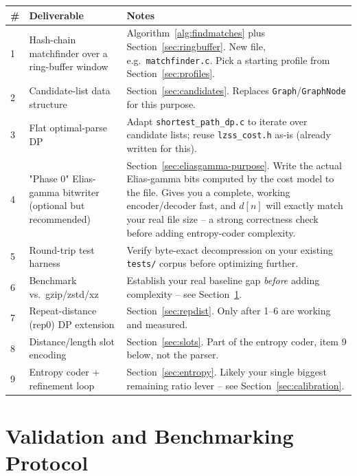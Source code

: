 \documentclass[11pt]{article}
\begin{document}
\begin{center}
\begin{tabular}{@{}p{0.5cm}p{4.3cm}p{7.5cm}@{}}
\toprule
\# & Deliverable & Notes \\
\midrule
1 & Hash-chain matchfinder over a ring-buffer window & Algorithm~\ref{alg:findmatches}
plus Section~\ref{sec:ringbuffer}. New file, e.g.\ \texttt{matchfinder.c}. Pick a
starting profile from Section~\ref{sec:profiles}. \\
2 & Candidate-list data structure & Section~\ref{sec:candidates}. Replaces
\texttt{Graph}/\texttt{GraphNode} for this purpose. \\
3 & Flat optimal-parse DP & Adapt \texttt{shortest\_path\_dp.c} to iterate over
candidate lists; reuse \texttt{lzss\_cost.h} as-is (already written for this). \\
4 & "Phase 0" Elias-gamma bitwriter (optional but recommended) & Section~\ref{sec:eliasgamma-purpose}.
Write the actual Elias-gamma bits computed by the cost model to the file. Gives you a
complete, working encoder/decoder fast, and $d[n]$ will exactly match your real file
size -- a strong correctness check before adding entropy-coder complexity. \\
5 & Round-trip test harness & Verify byte-exact decompression on your existing
\texttt{tests/} corpus before optimizing further. \\
6 & Benchmark vs.\ gzip/zstd/xz & Establish your real baseline gap \emph{before}
adding complexity -- see Section~\ref{sec:validation}. \\
7 & Repeat-distance (rep0) DP extension & Section~\ref{sec:repdist}. Only after 1--6
are working and measured. \\
8 & Distance/length slot encoding & Section~\ref{sec:slots}. Part of the entropy coder,
item 9 below, not the parser. \\
9 & Entropy coder + refinement loop & Section~\ref{sec:entropy}. Likely your single
biggest remaining ratio lever -- see Section~\ref{sec:calibration}. \\
\bottomrule
\end{tabular}
\end{center}

\section{Validation and Benchmarking Protocol}
\label{sec:validation}
\end{document}
